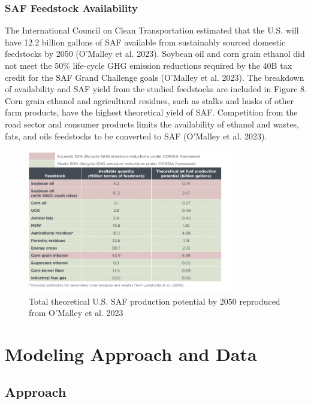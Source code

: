 \documentclass[12pt]{article}
\begin{document}
\begin{Appendix}
\subsubsection{SAF Feedstock Availability}

The International Council on Clean Transportation estimated that the U.S. will have 12.2 billion gallons of SAF available from sustainably sourced domestic feedstocks by 2050 (O’Malley et al. 2023). Soybean oil and corn grain ethanol did not meet the 50\% life-cycle GHG emission reductions required by the 40B tax credit for the SAF Grand Challenge goals (O’Malley et al. 2023). The breakdown of availability and SAF yield from the studied feedstocks are included in Figure 8. Corn grain ethanol and agricultural residues, such as stalks and husks of other farm products, have the highest theoretical yield of SAF. Competition from the road sector and consumer products limits the availability of ethanol and wastes, fats, and oils feedstocks to be converted to SAF (O’Malley et al. 2023). 

\begin{figure}[H]
\centering
\includegraphics[width=0.8\textwidth]{Figure 10.png} %
\caption{Total theoretical U.S. SAF production potential by 2050 reproduced from O’Malley et al. 2023}
\label{fig:figure10}
\end{figure}

\section{Modeling Approach and Data}

\subsection{Approach}


\end{Appendix}
\end{document}
